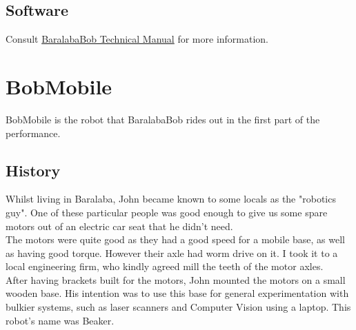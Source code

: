     		\subsection{Software}
    			Consult \hyperref[part:part_six]{BaralabaBob Technical Manual} for more information.
    			
    			\pagebreak
    
    \label{sec:BobMobile}
    \label{sec:Beaker}
    \section{BobMobile}
    	BobMobile is the robot that BaralabaBob rides out in the first part of the performance.
    	
    	\subsection{History}
    		Whilst living in Baralaba, John became known to some locals as the "robotics guy". One of these particular people was good enough to give us some spare motors out of an electric car seat that he didn't need.\\
    		
    		The motors were quite good as they had a good speed for a mobile base, as well as having good torque. However their axle had worm drive on it. I took it to a local engineering firm, who kindly agreed mill the teeth of the motor axles.\\
    		
    		After having brackets built for the motors, John mounted the motors on a small wooden base. His intention was to use this base for general experimentation with bulkier systems, such as laser scanners and Computer Vision using a laptop. This robot's name was Beaker. \\
    		
